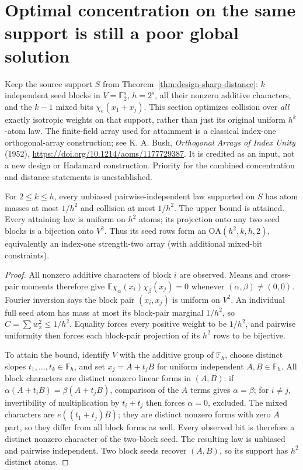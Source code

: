 \section{Optimal concentration on the same support is still a poor global solution}
\label{sec:design-concentration}
Keep the source support $S$ from Theorem~\ref{thm:design-sharp-distance}:
$k$ independent seed blocks in $V=\mathbb F_2^s$, $h=2^s$, all their
nonzero additive characters, and the $k-1$ mixed bits
$\chi_e(x_1+x_j)$. This section optimizes collision over \emph{all}
exactly isotropic weights on that support, rather than just its original
uniform $h^k$-atom law. The finite-field array used for attainment is a
classical index-one orthogonal-array construction; see K. A. Bush,
\emph{Orthogonal Arrays of Index Unity} (1952),
\url{https://doi.org/10.1214/aoms/1177729387}. It is credited as an
input, not a new design or Hadamard construction. Priority for the
combined concentration and distance statements is unestablished.

\begin{theorem}
\label{thm:design-face-optimum}
For $2\le k\le h$, every unbiased pairwise-independent law supported
on $S$ has atom masses at most $1/h^2$ and collision at most $1/h^2$.
The upper bound is attained. Every attaining law is uniform on $h^2$
atoms; its projection onto any two seed blocks is a bijection onto
$V^2$. Thus its seed rows form an $\mathrm{OA}(h^2,k,h,2)$, equivalently
an index-one strength-two array (with additional mixed-bit constraints).
\end{theorem}
\begin{proof}
All nonzero additive characters of block $i$ are observed. Means and
cross-pair moments therefore give
$\mathbb E\chi_\alpha(x_i)\chi_\beta(x_j)=0$ whenever
$(\alpha,\beta)\ne(0,0)$. Fourier inversion says the block pair
$(x_i,x_j)$ is uniform on $V^2$. An individual full seed atom has
mass at most its block-pair marginal $1/h^2$, so
$C=\sum w_x^2\le1/h^2$. Equality forces every positive weight to be
$1/h^2$, and pairwise uniformity then forces each block-pair projection
of its $h^2$ rows to be bijective.

To attain the bound, identify $V$ with the additive group of
$\mathbb F_h$, choose distinct slopes $t_1,\ldots,t_k\in\mathbb F_h$,
and set $x_j=A+t_jB$ for uniform independent $A,B\in\mathbb F_h$.
All block characters are distinct nonzero linear forms in $(A,B)$:
if $\alpha(A+t_iB)=\beta(A+t_jB)$, comparison of the $A$ terms gives
$\alpha=\beta$; for $i\ne j$, invertibility of multiplication by
$t_i+t_j$ then forces $\alpha=0$, excluded. The mixed characters are
$e((t_1+t_j)B)$; they are distinct nonzero forms with zero $A$ part,
so they differ from all block forms as well. Every observed bit is
therefore a distinct nonzero character of the two-block seed. The
resulting law is unbiased and pairwise independent. Two block seeds
recover $(A,B)$, so its support has $h^2$ distinct atoms.
\end{proof}

